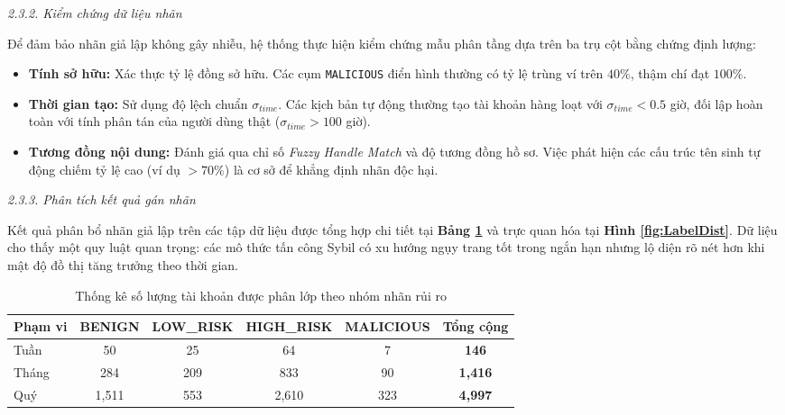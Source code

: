 \textit{2.3.2. Kiểm chứng dữ liệu nhãn}\vspace{0.2cm}

Để đảm bảo nhãn giả lập không gây nhiễu, hệ thống thực hiện kiểm chứng mẫu phân tầng dựa trên ba trụ cột bằng chứng định lượng:
\begin{itemize}[label={--}, itemsep=2pt]
    \item \textbf{Tính sở hữu:} Xác thực tỷ lệ đồng sở hữu. Các cụm \texttt{MALICIOUS} điển hình thường có tỷ lệ trùng ví trên $40\%$, thậm chí đạt $100\%$.
    \item \textbf{Thời gian tạo:} Sử dụng độ lệch chuẩn $\sigma_{time}$. Các kịch bản tự động thường tạo tài khoản hàng loạt với $\sigma_{time} < 0.5$ giờ, đối lập hoàn toàn với tính phân tán của người dùng thật ($\sigma_{time} > 100$ giờ).
    \item \textbf{Tương đồng nội dung:} Đánh giá qua chỉ số \textit{Fuzzy Handle Match} và độ tương đồng hồ sơ. Việc phát hiện các cấu trúc tên sinh tự động chiếm tỷ lệ cao (ví dụ $>70\%$) là cơ sở để khẳng định nhãn độc hại.
\end{itemize}

\textit{2.3.3. Phân tích kết quả gán nhãn}\vspace{0.2cm}

Kết quả phân bổ nhãn giả lập trên các tập dữ liệu được tổng hợp chi tiết tại \textbf{Bảng \ref{tab:LabelDist}} và trực quan hóa tại \textbf{Hình \ref{fig:LabelDist}}. Dữ liệu cho thấy một quy luật quan trọng: các mô thức tấn công Sybil có xu hướng ngụy trang tốt trong ngắn hạn nhưng lộ diện rõ nét hơn khi mật độ đồ thị tăng trưởng theo thời gian.

\begin{table}[H]
    \centering
    \caption{Thống kê số lượng tài khoản được phân lớp theo nhóm nhãn rủi ro}
    \label{tab:LabelDist}
    \setlength{\tabcolsep}{10pt}
    \renewcommand{\arraystretch}{1.3}
    \begin{tabular}{|l|c|c|c|c|c|}
        \hline
        \textbf{Phạm vi} & \textbf{BENIGN} & \textbf{LOW\_RISK} & \textbf{HIGH\_RISK} & \textbf{MALICIOUS} & \textbf{Tổng cộng} \\ \hline
        Tuần  & 50    & 25  & 64    & 7   & \textbf{146}   \\ \hline
        Tháng & 284   & 209 & 833   & 90  & \textbf{1,416} \\ \hline
        Quý   & 1,511 & 553 & 2,610 & 323 & \textbf{4,997} \\ \hline
    \end{tabular}
\end{table}

